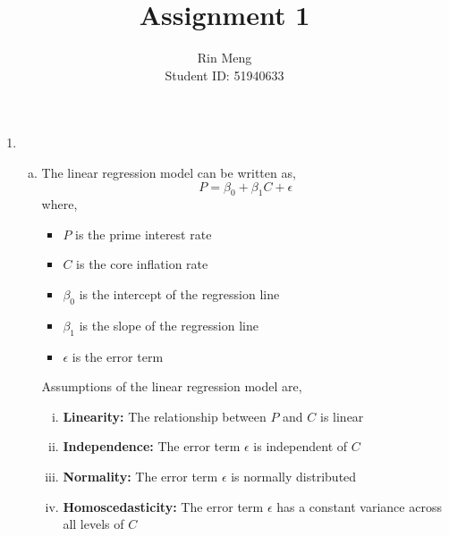 \documentclass[12pt]{article}
\title{Assignment 1}
\author{Rin Meng \\ Student ID: 51940633}
\begin{document}
\maketitle

\begin{enumerate}[1.]
    \item
    \begin{enumerate}[a.]
        \item The linear regression model can be written as, 
        \[P = \beta_0 + \beta_1 C + \epsilon\]
        where,
        \begin{itemize}
            \item $P$ is the prime interest rate
            \item $C$ is the core inflation rate
            \item $\beta_0$ is the intercept of the regression line
            \item $\beta_1$ is the slope of the regression line
            \item $\epsilon$ is the error term
        \end{itemize}
        Assumptions of the linear regression model are,
        \begin{enumerate}[i.]
            \item \textbf{Linearity:} The relationship between $P$ and $C$ is linear
            \item \textbf{Independence:} The error term $\epsilon$ is independent of $C$
            \item \textbf{Normality:} The error term $\epsilon$ is normally distributed
            \item \textbf{Homoscedasticity:} The error term $\epsilon$ has a constant variance across all levels of $C$
        \end{enumerate}
    \end{enumerate}


\end{enumerate}
\end{document}

